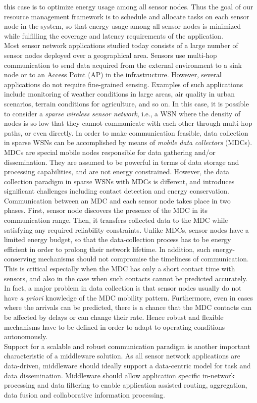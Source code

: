 this case is to optimize energy usage among all
sensor nodes. Thus the goal of our resource
management framework is to schedule and allocate
tasks on each sensor node in the system, so that
energy usage among all sensor nodes is minimized
while fulfilling the coverage and latency
requirements of the application.\\
Most sensor network applications studied today consists of a large number of sensor nodes 
deployed over a geographical area. Sensors use
multi-hop communication to send data acquired from
the external environment to a sink node or to an
Access Point (AP) in the infrastructure. However,
several applications do not require fine-grained sensing. Examples of such
applications include monitoring of weather
conditions in large areas, air quality in urban
scenarios, terrain conditions for agriculture, and
so on. In this case, it is possible to consider a
\emph{sparse wireless sensor network}, i.e., a WSN
where the density of nodes is so low that they
cannot communicate with each other through
multi-hop paths, or even directly. In order to make
communication feasible, data collection in sparse
WSNs can be accomplished by means of \emph{mobile
data collectors} (MDCs). MDCs are special mobile
nodes responsible for data gathering and/or
dissemination. They are assumed to be powerful in
terms of data storage and processing capabilities,
and are not energy constrained. However, the data
collection paradigm in sparse WSNs with MDCs is
different, and introduces significant challenges
including contact detection and energy
conservation. \\
Communication between an MDC and each sensor node
takes place in two phases. First, sensor node
discovers the presence of the MDC in its
communication range. Then, it transfers collected
data to the MDC while satisfying any required
reliability constraints. Unlike MDCs, sensor nodes
have a limited energy budget, so that the
data-collection process has to be energy efficient
in order to prolong their network lifetime. In
addition, such energy-conserving mechanisms should
not compromise the timeliness of communication.
This is critical especially when the MDC has only a
short contact time with sensors, and also in the
case when such contacts cannot be predicted
accurately. In fact, a major problem in data
collection is that sensor nodes usually do not have
\emph{a priori} knowledge of the MDC mobility
pattern. Furthermore, even in cases where the
arrivals can be predicted, there is a chance that
the MDC contacts can be affected by delays or can
change their rate. Hence robust and flexible
mechanisms have to be defined in order to adapt to
operating conditions autonomously.\\
%
Support for a scalable and robust communication
paradigm is another important characteristic of a
middleware solution. As all sensor network
applications are data-driven, middleware should
ideally support a data-centric model for task and
data dissemination. Middleware should allow
application specific in-network processing and data
filtering to enable application assisted routing,
aggregation, data fusion and collaborative
information processing. 
%
